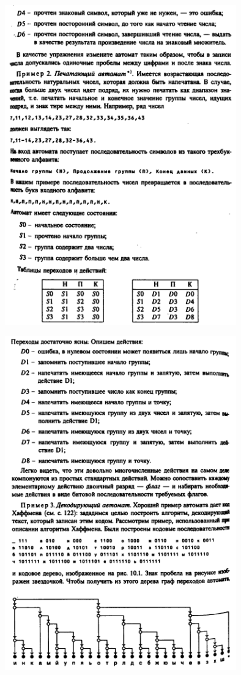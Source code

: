 \documentclass[discrete.tex]{subfiles}
\begin{document}
  \begin{figure}[H]
          \includegraphics[width=10cm]{pics/59_3}
          \centering
  \end{figure}

  \begin{figure}[H]
          \includegraphics[width=10cm]{pics/59_4}
          \centering
  \end{figure}
\end{document}
